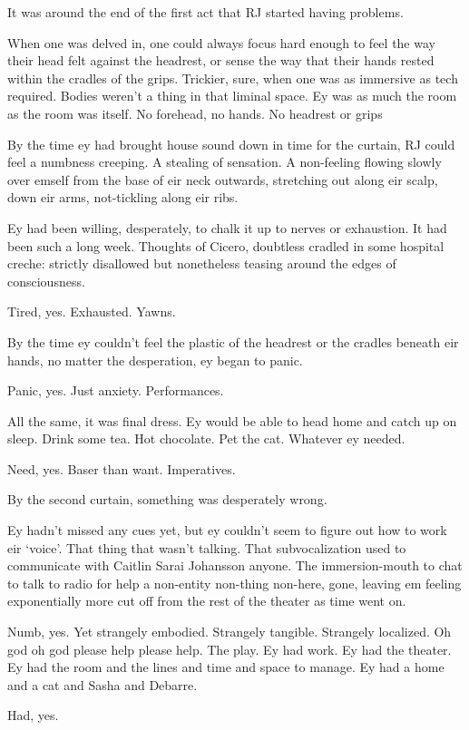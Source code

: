 It was around the end of the first act that RJ started having problems.

When one was delved in, one could always focus hard enough to feel the way their head felt against the headrest, or sense the way that their hands rested within the cradles of the grips. Trickier, sure, when one was as immersive as tech required. Bodies weren't a thing in that liminal space. Ey was as much the room as the room was itself. No forehead, no hands. No headrest or grips

By the time ey had brought house sound down in time for the curtain, RJ could feel a numbness creeping. A stealing of sensation. A non-feeling flowing slowly over emself from the base of eir neck outwards, stretching out along eir scalp, down eir arms, not-tickling along eir ribs.

Ey had been willing, desperately, to chalk it up to nerves or exhaustion. It had been such a long week. Thoughts of Cicero, doubtless cradled in some hospital creche: strictly disallowed but nonetheless teasing around the edges of consciousness.

Tired, yes. Exhausted. Yawns.

By the time ey couldn't feel the plastic of the headrest or the cradles beneath eir hands, no matter the desperation, ey began to panic.

Panic, yes. Just anxiety. Performances.

All the same, it was final dress. Ey would be able to head home and catch up on sleep. Drink some tea. Hot chocolate. Pet the cat. Whatever ey needed.

Need, yes. Baser than want. Imperatives.

By the second curtain, something was desperately wrong.

Ey hadn't missed any cues yet, but ey couldn't seem to figure out how to work eir `voice'. That thing that wasn't talking. That subvocalization used to communicate with Caitlin Sarai Johansson anyone. The immersion-mouth to chat to talk to radio for help a non-entity non-thing non-here, gone, leaving em feeling exponentially more cut off from the rest of the theater as time went on.

Numb, yes. Yet strangely embodied. Strangely tangible. Strangely localized. Oh god oh god please help please help. The play. Ey had work. Ey had the theater. Ey had the room and the lines and time and space to manage. Ey had a home and a cat and Sasha and Debarre.

Had, yes.

